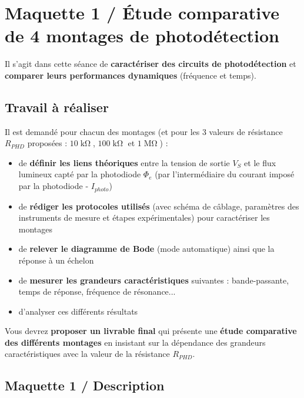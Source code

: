 \clearpage


\section{Maquette 1 / Étude comparative de 4 montages de photodétection}

Il s'agit dans cette séance de \textbf{caractériser des circuits de photodétection} et \textbf{comparer leurs performances dynamiques} (fréquence et temps).

\subsection{Travail à réaliser}

\bigskip

Il est demandé pour chacun des montages (et pour les 3 valeurs de résistance $R_{PHD}$ proposées : $10\operatorname{k\Omega}$, $100\operatorname{k\Omega}$ et $1\operatorname{M\Omega}$) : 

\begin{itemize}%
	\item de \textbf{définir les liens théoriques} entre la tension de sortie $V_S$ et le flux lumineux capté par la photodiode $\Phi_e$ (par l'intermédiaire du courant imposé par la photodiode - $I_{photo}$)
	\item de \textbf{rédiger les protocoles utilisés} (avec schéma de câblage, paramètres des instruments de mesure et étapes expérimentales) pour caractériser les montages
	\item de \textbf{relever le diagramme de Bode} (mode automatique) ainsi que la réponse à un échelon
	\item de \textbf{mesurer les grandeurs caractéristiques} suivantes : bande-passante, temps de réponse, fréquence de résonance...
	\item d'analyser ces différents résultats
\end{itemize}

\bigskip

Vous devrez \textbf{proposer un livrable final} qui présente une \textbf{étude comparative des différents montages} en insistant sur la dépendance des grandeurs caractéristiques avec la valeur de la résistance $R_{PHD}$.



\subsection{Maquette 1 / Description}

